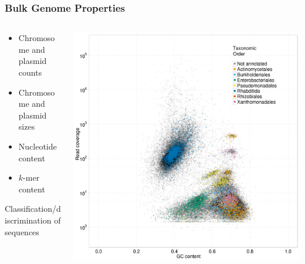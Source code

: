 \begin{frame}
  \frametitle{Bulk Genome Properties}
  \begin{columns}[T]
    \begin{column}{5cm}
      \begin{itemize}
        \item Chromosome and plasmid counts
        \item Chromosome and plasmid sizes
        \item Nucleotide content
        \item $k$-mer content
      \end{itemize}    
      Classification/discrimination of sequences\\
    \end{column}
    \begin{column}{5cm}
      \includegraphics[width=1\textwidth]{images/blobology}
    \end{column}
  \end{columns}
\end{frame}

